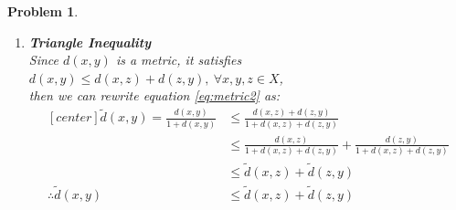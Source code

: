 \documentclass[a4paper,12pt]{article}
\newtheorem{prob}{Problem}[]
\begin{document}
\begin{prob}
\begin{enumerate}[label=(\alph*)]
		\item \textbf{Triangle Inequality}\\
		Since $d(x,y)$ is a metric, it satisfies $d(x,y) \leq d(x,z) + d(z,y),\ \forall x,y,z \in X$,\\
		then we can rewrite equation \eqref{eq:metric2} as:
		\begin{equation*}
		\begin{aligned}[center]
		\tilde{d}(x,y) = \frac{d(x,y)}{1+d(x,y)} &\leq \frac{d(x,z) + d(z,y)}{1+d(x,z) + d(z,y)}\\
		&\leq \frac{d(x,z)}{1+d(x,z) + d(z,y)} + \frac{d(z,y)}{1+d(x,z) + d(z,y)}\\
		&\leq \tilde{d}(x,z) + \tilde{d}(z,y)\\
		\therefore \tilde{d}(x,y) &\leq \tilde{d}(x,z) + \tilde{d}(z,y)
		\end{aligned}
		\end{equation*}
	\end{enumerate}
\end{prob}
\end{document}
